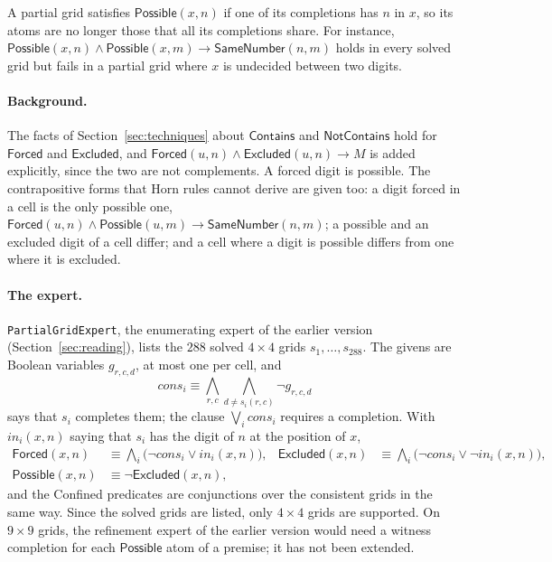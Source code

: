 \documentclass[11pt,a4paper]{article}
\theoremstyle{definition}
\theoremstyle{remark}
\newcommand{\code}[1]{\texttt{#1}}
\newcommand{\pred}[1]{\mathsf{#1}}
\newcommand{\Contains}{\pred{Contains}}
\newcommand{\NotContains}{\pred{NotContains}}
\newcommand{\Forced}{\pred{Forced}}
\newcommand{\Excluded}{\pred{Excluded}}
\begin{document}
A partial grid satisfies $\pred{Possible}(x, n)$ if one of its completions has $n$ in $x$, so its atoms are no longer those that all its completions share. For instance, $\pred{Possible}(x, n) \wedge \pred{Possible}(x, m) \to \pred{SameNumber}(n, m)$ holds in every solved grid but fails in a partial grid where $x$ is undecided between two digits.

\paragraph{Background.} The facts of Section~\ref{sec:techniques} about $\Contains$ and $\NotContains$ hold for $\Forced$ and $\Excluded$, and $\Forced(u, n) \wedge \Excluded(u, n) \to M$ is added explicitly, since the two are not complements. A forced digit is possible. The contrapositive forms that Horn rules cannot derive are given too: a digit forced in a cell is the only possible one, $\Forced(u, n) \wedge \pred{Possible}(u, m) \to \pred{SameNumber}(n, m)$; a possible and an excluded digit of a cell differ; and a cell where a digit is possible differs from one where it is excluded.

\paragraph{The expert.} \code{PartialGridExpert}, the enumerating expert of the earlier version (Section~\ref{sec:reading}), lists the $288$ solved $4 \times 4$ grids $s_1, \dots, s_{288}$. The givens are Boolean variables $g_{r,c,d}$, at most one per cell, and
\[
  \mathit{cons}_i \equiv \bigwedge_{r, c} \bigwedge_{d \neq s_i(r,c)} \neg g_{r,c,d}
\]
says that $s_i$ completes them; the clause $\bigvee_i \mathit{cons}_i$ requires a completion. With $\mathit{in}_i(x, n)$ saying that $s_i$ has the digit of $n$ at the position of $x$,
\begin{align*}
  \Forced(x, n) &\equiv \textstyle\bigwedge_i \bigl(\neg\mathit{cons}_i \vee \mathit{in}_i(x, n)\bigr), &
  \Excluded(x, n) &\equiv \textstyle\bigwedge_i \bigl(\neg\mathit{cons}_i \vee \neg\mathit{in}_i(x, n)\bigr),\\
  \pred{Possible}(x, n) &\equiv \neg\Excluded(x, n),
\end{align*}
and the Confined predicates are conjunctions over the consistent grids in the same way. Since the solved grids are listed, only $4 \times 4$ grids are supported. On $9 \times 9$ grids, the refinement expert of the earlier version would need a witness completion for each $\pred{Possible}$ atom of a premise; it has not been extended.
\end{document}
